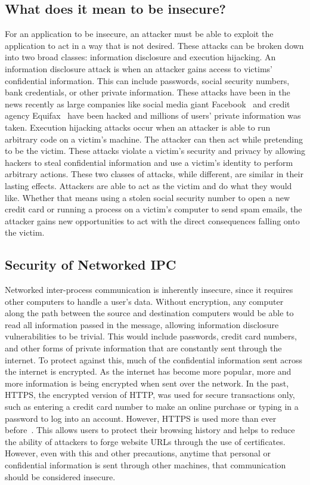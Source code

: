 \subsection{What does it mean to be insecure?}
For an application to be insecure, an attacker must be able to exploit the application to act in a way that is not desired.  These attacks can be broken down into two broad classes: information disclosure and execution hijacking.  An information disclosure attack is when an attacker gains access to victims' confidential information.  This can include passwords, social security numbers, bank credentials, or other private information.  These attacks have been in the news recently as large companies like social media giant Facebook~\cite{o'sullivan_2018} and credit agency Equifax~\cite{timberg_dwoskin_fung_2017} have been hacked and millions of users' private information was taken.  Execution hijacking attacks occur when an attacker is able to run arbitrary code on a victim's machine.  The attacker can then act while pretending to be the victim.  These attacks violate a victim's security and privacy by allowing hackers to steal confidential information and use a victim's identity to perform arbitrary actions.  These two classes of attacks, while different, are similar in their lasting effects.  Attackers are able to act as the victim and do what they would like.  Whether that means using a stolen social security number to open a new credit card or running a process on a victim's computer to send spam emails, the attacker gains new opportunities to act with the direct consequences falling onto the victim.

\subsection{Security of Networked IPC}
Networked inter-process communication is inherently insecure, since it requires other computers to handle a user's data.  Without encryption, any computer along the path between the source and destination computers would be able to read all information passed in the message, allowing information disclosure vulnerabilities to be trivial.  This would include passwords, credit card numbers, and other forms of private information that are constantly sent through the internet.  To protect against this, much of the confidential information sent across the internet is encrypted.  As the internet has become more popular, more and more information is being encrypted when sent over the network.  In the past, HTTPS, the encrypted version of HTTP, was used for secure transactions only, such as entering a credit card number to make an online purchase or typing in a password to log into an account.  However, HTTPS is used more than ever before~\cite{google_transparency_report}.  This allows users to protect their browsing history and helps to reduce the ability of attackers to forge website URLs through the use of certificates.  However, even with this and other precautions, anytime that personal or confidential information is sent through other machines, that communication should be considered insecure.

